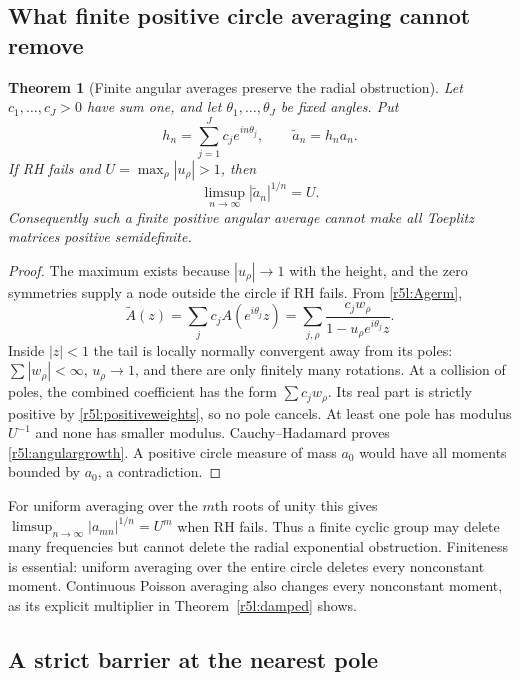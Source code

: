 \documentclass[11pt,a4paper]{article}
\newtheorem{theorem}{Theorem}[section]
\theoremstyle{definition}\newtheorem{definition}[theorem]{Definition}
\theoremstyle{remark}\newtheorem{remark}[theorem]{Remark}
\numberwithin{equation}{section}
\begin{document}
\subsection{What finite positive circle averaging cannot remove}

\begin{theorem}[Finite angular averages preserve the radial obstruction]
\label{r5l:angularnogap}
Let $c_1,\ldots,c_J>0$ have sum one, and let
$\theta_1,\ldots,\theta_J$ be fixed angles.  Put
\[
 h_n=\sum_{j=1}^Jc_je^{in\theta_j},
 \qquad \widetilde a_n=h_na_n.
\]
If RH fails and $U=\max_\rho|u_\rho|>1$, then
\begin{equation}\label{r5l:angulargrowth}
 \limsup_{n\to\infty}|\widetilde a_n|^{1/n}=U.
\end{equation}
Consequently such a finite positive angular average cannot make
all Toeplitz matrices positive semidefinite.
\end{theorem}
\begin{proof}
The maximum exists because $|u_\rho|\to1$ with the height, and
the zero symmetries supply a node outside the circle if RH fails.
From \eqref{r5l:Agerm},
\[
 \widetilde A(z)=\sum_jc_jA(e^{i\theta_j}z)
 =\sum_{j,\rho}\frac{c_jw_\rho}{1-u_\rho e^{i\theta_j}z}.
\]
Inside $|z|<1$ the tail is locally normally convergent away from
its poles: $\sum|w_\rho|<\infty$, $u_\rho\to1$, and there are
only finitely many rotations.  At a collision of poles, the
combined coefficient has the form $\sum c_jw_\rho$.  Its real
part is strictly positive by \eqref{r5l:positiveweights}, so no
pole cancels.  At least one pole has modulus $U^{-1}$ and none
has smaller modulus.  Cauchy--Hadamard proves
\eqref{r5l:angulargrowth}.  A positive circle measure of mass
$a_0$ would have all moments bounded by $a_0$, a contradiction.
\end{proof}

For uniform averaging over the $m$th roots of unity this gives
$\limsup_{n\to\infty}|a_{mn}|^{1/n}=U^m$ when RH fails.
Thus a finite cyclic group may delete many frequencies but cannot
delete the radial exponential obstruction.  Finiteness is essential:
uniform averaging over the entire circle deletes every nonconstant
moment.  Continuous Poisson averaging also changes every nonconstant
moment, as its explicit multiplier in Theorem~\ref{r5l:damped} shows.

\subsection{A strict barrier at the nearest pole}
\end{document}
